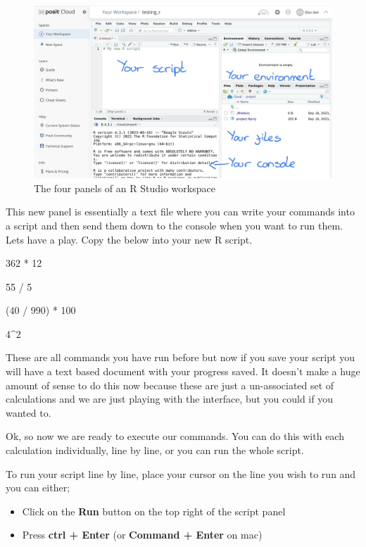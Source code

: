 \documentclass[
]{book}
\newenvironment{Shaded}{\begin{snugshade}}{\end{snugshade}}
\newcommand{\DecValTok}[1]{\textcolor[rgb]{0.00,0.00,0.81}{#1}}
\newcommand{\NormalTok}[1]{#1}
\newcommand{\SpecialCharTok}[1]{\textcolor[rgb]{0.00,0.00,0.00}{#1}}
\providecommand{\tightlist}{%
  \setlength{\itemsep}{0pt}\setlength{\parskip}{0pt}}
\begin{document}
\begin{figure}
\includegraphics[width=0.9\linewidth]{figures/posit7} \caption{The four panels of an R Studio workspace}\label{fig:unnamed-chunk-12}
\end{figure}

This new panel is essentially a text file where you can write your commands into a script and then send them down to the console when you want to run them. Lets have a play. Copy the below into your new R script.

\begin{Shaded}
\begin{Highlighting}[]
\DecValTok{362} \SpecialCharTok{*} \DecValTok{12}

\DecValTok{55} \SpecialCharTok{/} \DecValTok{5}

\NormalTok{(}\DecValTok{40} \SpecialCharTok{/} \DecValTok{990}\NormalTok{) }\SpecialCharTok{*} \DecValTok{100}

\DecValTok{4}\SpecialCharTok{\^{}}\DecValTok{2}
\end{Highlighting}
\end{Shaded}

These are all commands you have run before but now if you save your script you will have a text based document with your progress saved. It doesn't make a huge amount of sense to do this now because these are just a un-associated set of calculations and we are just playing with the interface, but you could if you wanted to.

Ok, so now we are ready to execute our commands. You can do this with each calculation individually, line by line, or you can run the whole script.

To run your script line by line, place your cursor on the line you wish to run and you can either;

\begin{itemize}
\tightlist
\item
  Click on the \textbf{Run} button on the top right of the script panel
\item
  Press \textbf{ctrl + Enter} (or \textbf{Command + Enter} on mac)
\end{itemize}
\end{document}
